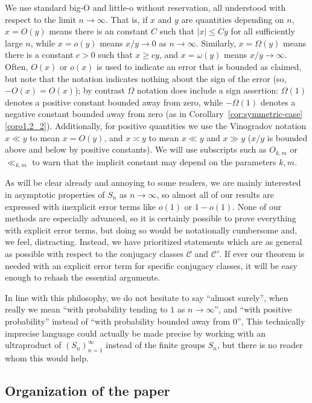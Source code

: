 \documentclass[ALCO,ThmDefs,Unicode,epreuves]{cedram}
\newcommand\calC{\mathcal{C}}
\begin{document}
We use standard big-O and little-o without reservation, all understood with respect to the limit $n \to\infty$.
That is, if $x$ and $y$ are quantities depending on $n$, $x = O(y)$ means there is an constant $C$ such that $|x| \leq C y$ for all sufficiently large $n$,
while $x = o(y)$ means $x/y \to 0$ as $n\to\infty$.
Similarly, $x = \Omega(y)$ means there is a constant $c>0$ such that $x \geq c y$, and $x = \omega(y)$ means $x/y \to \infty$.
Often, $O(x)$ or $o(x)$ is used to indicate an error that is bounded as claimed, but note that the notation indicates nothing about the sign of the error (so, \eg $-O(x) = O(x)$);
by contrast $\Omega$ notation does include a sign assertion: $\Omega(1)$ denotes a positive constant bounded away from zero, while $-\Omega(1)$ denotes a negative constant bounded away from zero (\eg as in Corollary~\ref{cor:symmetric-case}\eqref{coro1.2_2}).
Additionally, for positive quantities we use the Vinogradov notation $x \ll y$ to mean $x = O(y)$, and $x \asymp y$ to mean $x \ll y$ and $x \gg y$ (\ie $x/y$ is bounded above and below by positive constants).
We will use subscripts such as $O_{k,m}$ or $\ll_{k,m}$ to warn that the implicit constant may depend on the parameters $k, m$.

As will be clear already and annoying to some readers, we are mainly interested in asymptotic properties of $S_n$ as $n\to\infty$, so almost all of our results are expressed with inexplicit error terms like $o(1)$ or $1 - o(1)$. None of our methods are especially advanced, so it is certainly possible to prove everything with explicit error terms, but doing so would be notationally cumbersome and, we feel, distracting. Instead, we have prioritized statements which are as general as possible with respect to the conjugacy classes $\calC$ and $\calC'$. If ever our theorem is needed with an explicit error term for specific conjugacy classes, it will be easy enough to rehash the essential arguments.

In line with this philosophy, we do not hesitate to say ``almost surely'', when really we mean ``with probability tending to $1$ as $n\to\infty$'', and ``with positive probability'' instead of ``with probability bounded away from $0$'', \etc This technically imprecise language could actually be made precise by working with an ultraproduct of $(S_n)_{n=1}^\infty$ instead of the finite groups $S_n$, but there is no reader whom this would help.

\subsection{Organization of the paper}
\end{document}
